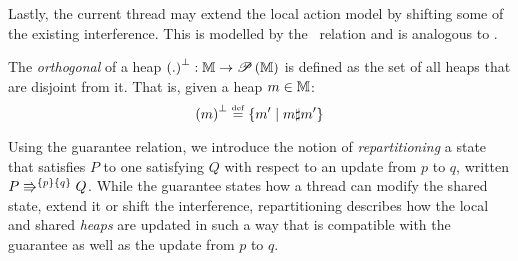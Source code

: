 Lastly, the current thread may extend the local action model by shifting some of the existing interference. This is modelled by the \shiftG\ relation and is analogous to \shiftR.
%
%
\begin{definition}[Orthogonal]\label{def:orthogonal}
The \emph{orthogonal} of a heap  $\heapSize{.}: \Heaps \rightarrow \pset{\Heaps}$ is defined as the set of all heaps that are disjoint from it. That is, given a heap $m \in \Heaps$:
%
\[
	\heapSize{m} \eqdef \left\{ m' \mid m \disjoint m' \right\}
\]
%
\end{definition}
%
Using the guarantee relation, we introduce the notion of \emph{repartitioning} a state that satisfies $P$ to one satisfying $Q$ with respect to an update from $p$ to $q$, written $\repartitions{P}{Q}{p}{q}$. While the guarantee states how a thread can modify the shared state, extend it or shift the interference, repartitioning describes how the local and shared \emph{heaps} are updated in such a way that is compatible with the guarantee as well as the update from $p$ to $q$.
%

